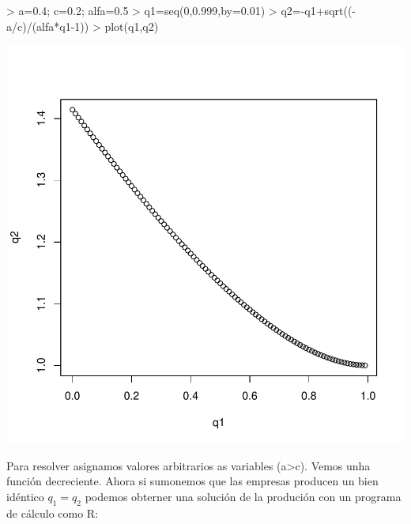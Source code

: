 \documentclass{article}
\begin{document}
\begin{Schunk}
\begin{Sinput}
> a=0.4; c=0.2; alfa=0.5
> q1=seq(0,0.999,by=0.01)
> q2=-q1+sqrt((-a/c)/(alfa*q1-1))
> plot(q1,q2)
\end{Sinput}
\end{Schunk}
\includegraphics{PUTAPRUEBA-001}



Para resolver asignamos valores arbitrarios as variables (a>c). Vemos unha funci\'on decreciente. Ahora si sumonemos que las empresas producen un bien id\'entico $q_1=q_2$ podemos obterner una solución de la produci\'on con un programa de c\'alculo como R:
\end{document}
